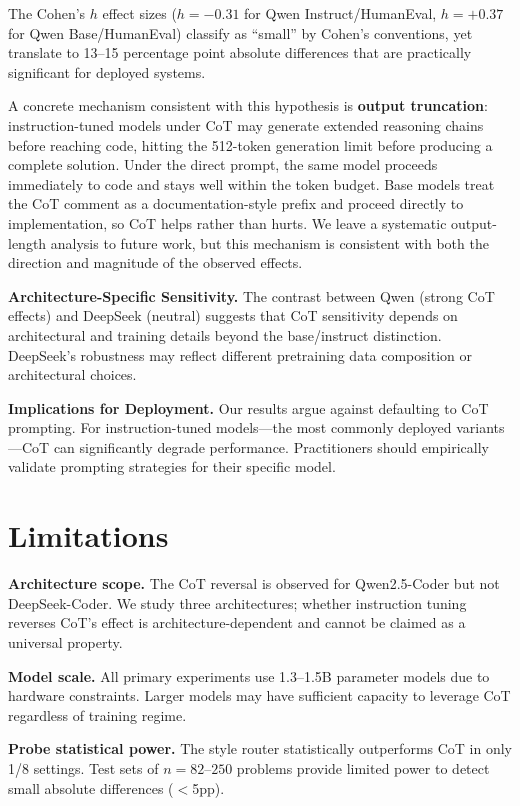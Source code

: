 \documentclass[11pt]{article}
\begin{document}
The Cohen's $h$ effect sizes ($h = -0.31$ for Qwen Instruct/HumanEval, $h = +0.37$ for Qwen Base/HumanEval) classify as ``small'' by Cohen's conventions, yet translate to 13--15 percentage point absolute differences that are practically significant for deployed systems.

A concrete mechanism consistent with this hypothesis is \textbf{output truncation}: instruction-tuned models under CoT may generate extended reasoning chains before reaching code, hitting the 512-token generation limit before producing a complete solution. Under the direct prompt, the same model proceeds immediately to code and stays well within the token budget. Base models treat the CoT comment as a documentation-style prefix and proceed directly to implementation, so CoT helps rather than hurts. We leave a systematic output-length analysis to future work, but this mechanism is consistent with both the direction and magnitude of the observed effects.

\textbf{Architecture-Specific Sensitivity.} The contrast between Qwen (strong CoT effects) and DeepSeek (neutral) suggests that CoT sensitivity depends on architectural and training details beyond the base/instruct distinction. DeepSeek's robustness may reflect different pretraining data composition or architectural choices.

\textbf{Implications for Deployment.} Our results argue against defaulting to CoT prompting. For instruction-tuned models---the most commonly deployed variants---CoT can significantly degrade performance. Practitioners should empirically validate prompting strategies for their specific model.

\section*{Limitations}

\textbf{Architecture scope.} The CoT reversal is observed for Qwen2.5-Coder but not DeepSeek-Coder. We study three architectures; whether instruction tuning reverses CoT's effect is architecture-dependent and cannot be claimed as a universal property.

\textbf{Model scale.} All primary experiments use 1.3--1.5B parameter models due to hardware constraints. Larger models may have sufficient capacity to leverage CoT regardless of training regime.

\textbf{Probe statistical power.} The style router statistically outperforms CoT in only 1/8 settings. Test sets of $n{=}82$--$250$ problems provide limited power to detect small absolute differences ($<$5pp).
\end{document}
